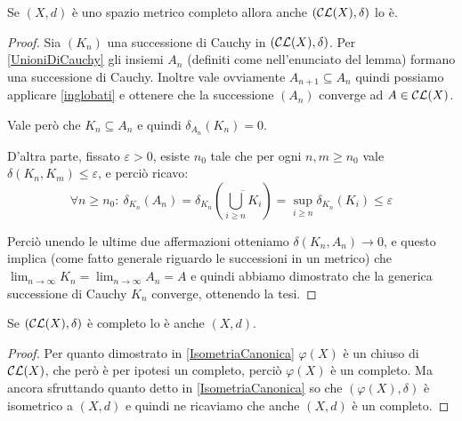 \begin{theorem} \label{CompletezzaCL}
	Se $(X,d)$ è uno spazio metrico completo allora anche $(\mathcal{CL}(X),\delta)$ lo è.
\end{theorem}
\begin{proof}
	Sia $(K_n)$ una successione di Cauchy in $(\mathcal{CL}(X),\delta)$.
	Per \cref{UnioniDiCauchy} gli insiemi $A_n$ (definiti come nell'enunciato del lemma) formano una successione di Cauchy.
	Inoltre vale ovviamente $A_{n+1}\subseteq A_n$ quindi possiamo applicare \cref{inglobati} e ottenere che la successione $(A_n)$ converge ad $A\in\mathcal{CL}(X)$.
	
	Vale però che $K_n\subseteq A_n$ e quindi $\delta_{A_n}(K_n)=0$.
	
	D'altra parte, fissato $\varepsilon > 0$, esiste $n_0$ tale che per ogni $n,m\ge n_0$ vale $\delta(K_n,K_m)\le \varepsilon$, e perciò ricavo:
	\begin{equation*}
		\forall n\ge n_0:\ \delta_{K_n}(A_n)=\delta_{K_n}\left(\overline{\bigcup_{i\ge n} K_i}\right)
		=\sup_{i\ge n}\delta_{K_n}(K_i)\le \varepsilon
	\end{equation*}
	
	Perciò unendo le ultime due affermazioni otteniamo $\delta(K_n,A_n)\to 0$, e questo implica (come fatto generale riguardo le successioni in un metrico) che $\lim_{n\to\infty}K_n=\lim_{n\to\infty}A_n=A$ e quindi abbiamo dimostrato che la generica successione di Cauchy $K_n$ converge, ottenendo la tesi.
\end{proof}

\begin{remark}\label{CompletezzaInverso}
Se $\left (\mathcal{CL}(X),\delta \right ) $ è completo lo è anche $(X,d)$.
\end{remark}
\begin{proof}
Per quanto dimostrato in \cref{IsometriaCanonica} $\varphi(X)$ è un chiuso di $\mathcal{CL}(X)$, che però è per ipotesi un completo, perciò $\varphi(X)$ è un completo. Ma ancora sfruttando quanto detto in \cref{IsometriaCanonica} so che $(\varphi(X),\delta)$ è isometrico a $(X,d)$ e quindi ne ricaviamo che anche $(X,d)$ è un completo.
\end{proof}
